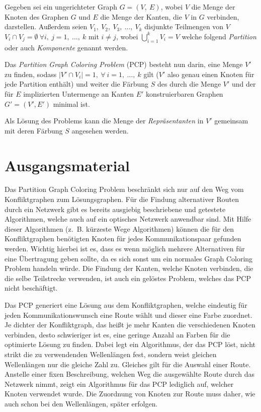 Gegeben sei ein ungerichteter Graph $G = (V,\ E)$, wobei $V$ die Menge der Knoten des Graphen $G$ und $E$ die Menge der Kanten, die $V$ in $G$ verbinden, darstellen. Außerdem seien $V_1,\ V_2,\ V_3,\ \ldots,\ V_k$ disjunkte Teilmengen von $V$ $V_i \cap V_j = \emptyset \ \forall i,\ j = 1,\ \ldots,\ k$ mit $i \not = j$, wobei $\bigcup_{i = 1}^k V_i = V$ welche folgend \textit{Partition} oder auch \textit{Komponente} genannt werden.

Das \textit{Partition Graph Coloring Problem} (PCP) besteht nun darin, eine Menge $V'$ zu finden, sodass $|V' \cap V_i| = 1,\ \forall\ i = 1,\ \ldots,\ k$ gilt ($V'$ also genau einen Knoten für jede Partition enthält) und weiter die Färbung $S$ des durch die Menge $V'$ und der für $E$ implizierten Untermenge an Kanten $E'$ konstruierbaren Graphen $G' = (V', E')$ minimal ist.

Als Lösung des Problems kann die Menge der \textit{Repräsentanten} in $V'$ gemeinsam mit deren Färbung $S$ angesehen werden.

\section{Ausgangsmaterial}
Das Partition Graph Coloring Problem beschränkt sich nur auf den Weg vom Konfliktgraphen zum Lösungsgraphen. Für die Findung alternativer Routen durch ein Netzwerk gibt es 
bereits ausgiebig beschriebene und getestete Algorithmen, welche auch auf ein optisches Netzwerk anwendbar sind. Mit Hilfe dieser Algorithmen (z.\ B. kürzeste Wege Algorithmen) können die für den
Konfliktgraphen benötigten Knoten für jedes Kommunikationspaar gefunden werden. Wichtig hierbei ist es, dass es wenn möglich mehrere Alternativen für eine Übertragung geben sollte,
da es sich sonst um ein normales Graph Coloring Problem handeln würde. Die Findung der Kanten, welche Knoten verbinden, die die selbe Teilstrecke verwenden, ist auch ein
gelöstes Problem, welches das PCP nicht beschäftigt.

Das PCP generiert eine Lösung aus dem Konfliktgraphen, welche eindeutig für jeden Kommunikationswunsch eine Route wählt und dieser eine Farbe zuordnet. Je dichter der Konfliktgraph, das heißt
je mehr Kanten die verschiedenen Knoten verbinden, desto schwieriger ist es, eine geringe Anzahl an Farben für die optimierte Lösung zu finden. Dabei legt ein Algorithmus, der das
PCP löst, nicht strikt die zu verwendenden Wellenlängen fest, sondern weist gleichen Wellenlängen nur die gleiche Zahl zu. Gleiches gilt für die Auswahl einer Route. Anstelle
einer fixen Beschreibung, welchen Weg die ausgewählte Route durch das Netzwerk nimmt, zeigt ein Algorithmus für das PCP lediglich auf, welcher Knoten verwendet wurde. 
Die Zuordnung von Knoten zur Route muss daher, wie auch schon bei den Wellenlängen, später erfolgen.

